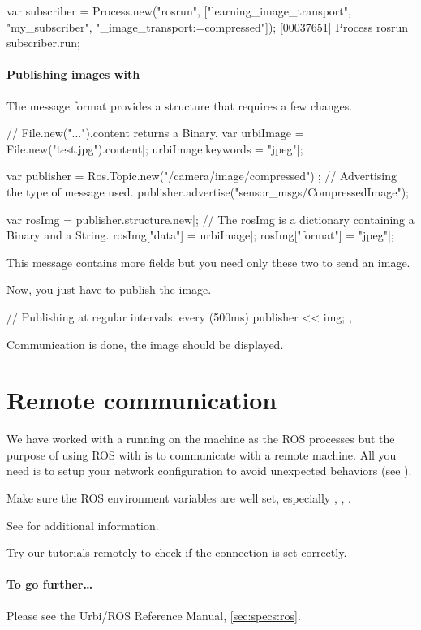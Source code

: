 \begin{urbiunchecked}
var subscriber =
  Process.new("rosrun",
              ["learning_image_transport", "my_subscriber",
              "_image_transport:=compressed"]);
[00037651] Process rosrun
subscriber.run;
\end{urbiunchecked}

\paragraph{Publishing images with \urbi}

The  message format provides a
structure that requires a few changes.

\begin{urbiunchecked}
// File.new("...").content returns a Binary.
var urbiImage = File.new("test.jpg").content|;
urbiImage.keywords = "jpeg"|;

var publisher = Ros.Topic.new("/camera/image/compressed")|;
// Advertising the type of message used.
publisher.advertise("sensor_msgs/CompressedImage");

var rosImg = publisher.structure.new|;
// The rosImg is a dictionary containing a Binary and a String.
rosImg["data"] = urbiImage|;
rosImg["format"] = "jpeg"|;
\end{urbiunchecked}

This message contains more fields but you need only these two to
send an image.

Now, you just have to publish the image.

\begin{urbiunchecked}
// Publishing at regular intervals.
every (500ms)
{
  publisher << img;
},
\end{urbiunchecked}

Communication is done, the image should be displayed.

\section{Remote communication}

We have worked with a  running on the machine as the ROS
processes but the purpose of using ROS with \urbi is to communicate with a
remote machine.  All you need is to setup your network configuration to
avoid unexpected behaviors (see ).

Make sure the ROS environment variables are well set, especially
, , .

See  for additional information.

Try our tutorials remotely to check if the connection is set correctly.

\paragraph{To go further\ldots}
Please see the Urbi/ROS Reference Manual, \autoref{sec:specs:ros}.


